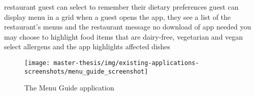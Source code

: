   restaurant guest can select to remember their dietary preferences
  guest can display menu in a grid
  when a guest opens the app, they see a list of the restaurant's menus and the restaurant message
  no download of app needed
  you may choose to highlight food items that are dairy-free, vegetarian and vegan
  select allergens and the app highlights affected dishes

  \begin{figure}[h]
    \centering
    \texttt{[image: master-thesis/img/existing-applications-screenshots/menu\_guide\_screenshot]}
    \caption{The Menu Guide application}
  \end{figure}


